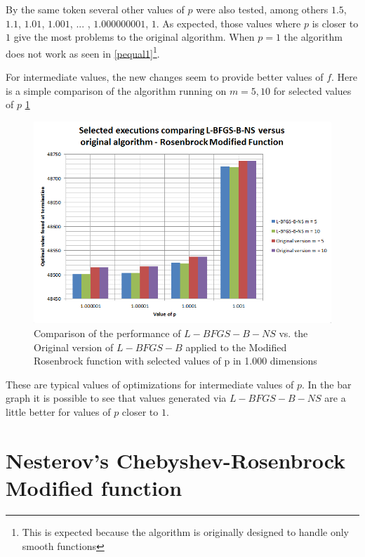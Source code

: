 By the same token several other values of $p$ were also tested, among others $1.5$, $1.1$, $1.01$, $1.001$, ... , $1.000000001$, $1$. As expected, those values where $p$ is closer to $1$ give the most problems to the original algorithm. When $p=1$ the algorithm does not work as seen in \ref{pequal1}\footnote{This is expected because the algorithm is originally designed to handle only smooth functions}.

For intermediate values, the new changes seem to provide better values of $f$. Here is a simple comparison of the algorithm running on $m = 5,10$ for selected values of $p$ \ref{pcomp}

\begin{figure}
\begin{center}
\includegraphics[scale=0.75]{Figures/ComparisonNewOld.PNG}
\caption[Comparison of selected values of the Modified Rosenbrock function]{Comparison of the performance of $L-BFGS-B-NS$ vs. the Original version of $L-BFGS-B$ applied to the Modified Rosenbrock function with selected values of p in 1.000 dimensions}
\label{pcomp}
\end{center}
\end{figure}

These are typical values of optimizations for intermediate values of $p$. In the bar graph it is possible to see that values generated via $L-BFGS-B-NS$ are a little better for values of $p$ closer to $1$.

\section{Nesterov's Chebyshev-Rosenbrock Modified function}

